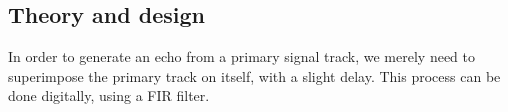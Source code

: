 
\subsection{Theory and design}
In order to generate an echo from a primary signal track, we merely need to superimpose the primary track on itself, with a slight delay. This process can be done digitally, using a FIR filter.
